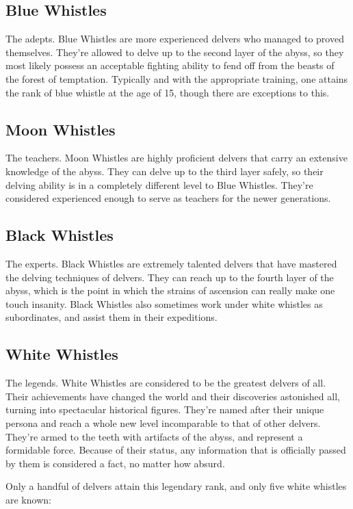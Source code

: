 \subsection{Blue Whistles}
The adepts. Blue Whistles are more experienced delvers who managed to proved themselves. They're allowed to delve up to the second layer of the abyss, so they most likely possess an acceptable fighting ability to fend off from the beasts of the forest of temptation. Typically and with the appropriate training, one attains the rank of blue whistle at the age of 15, though there are exceptions to this. 

\subsection{Moon Whistles}
The teachers. Moon Whistles are highly proficient delvers that carry an extensive knowledge of the abyss. They can delve up to the third layer safely, so their delving ability is in a completely different level to Blue Whistles. They're considered experienced enough to serve as teachers for the newer generations. 

\subsection{Black Whistles}
The experts. Black Whistles are extremely talented delvers that have mastered the delving techniques of delvers. They can reach up to the fourth layer of the abyss, which is the point in which the strains of ascension can really make one touch insanity. Black Whistles also sometimes work under white whistles as subordinates, and assist them in their expeditions. 

\subsection{White Whistles}
The legends. White Whistles are considered to be the greatest delvers of all. Their achievements have changed the world and their discoveries astonished all, turning into spectacular historical figures. They're named after their unique persona and reach a whole new level incomparable to that of other delvers. They're armed to the teeth with artifacts of the abyss, and represent a formidable force. Because of their status, any information that is officially passed by them is considered a fact, no matter how absurd.

Only a handful of delvers attain this legendary rank, and only five white whistles are known:

